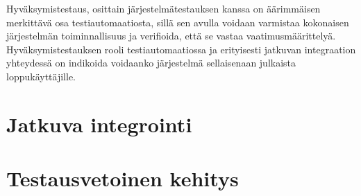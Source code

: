   Hyväksymistestaus, osittain järjestelmätestauksen kanssa on äärimmäisen merkittävä osa testiautomaatiosta, sillä sen avulla voidaan varmistaa kokonaisen järjestelmän toiminnallisuus ja verifioida, että se vastaa vaatimusmäärittelyä.
  Hyväksymistestauksen rooli testiautomaatiossa ja erityisesti jatkuvan integraation yhteydessä on indikoida voidaanko järjestelmä sellaisenaan julkaista loppukäyttäjille.

\section{Jatkuva integrointi} \label{ch:07_jatkuva_integrointi}


\section{Testausvetoinen kehitys} \label{ch:07_testausvetoinen_kehitys}

